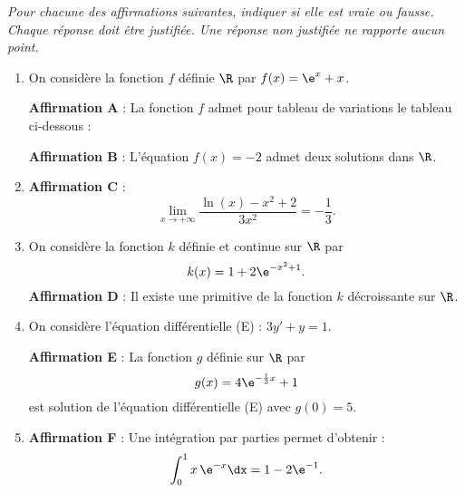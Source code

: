 \textit{Pour chacune des affirmations suivantes, indiquer si elle est vraie ou fausse.\\Chaque réponse doit être justifiée. Une réponse non justifiée ne rapporte aucun point.}

\smallskip

\begin{enumerate}
	\item On considère la fonction $f$ définie $\R$ par $f(x)=\e^x+x$.
	
	\textbf{Affirmation A} : La fonction $f$ admet pour tableau de variations le tableau ci-dessous :
	
	\begin{Centrage}
	\end{Centrage}
	
	\textbf{Affirmation B} : L’équation $f(x)=-2$ admet deux solutions dans $\R$.
	\item \textbf{Affirmation C} : \[ \lim\limits_{x\to+\infty} \frac{\ln(x)-x^2+2}{3x^2}=-\frac13. \]
	\item On considère la fonction $k$ définie et continue sur $\R$ par \[   k(x) = 1 + 2\e^{-x^2+1}.\]
	\textbf{Affirmation D} : Il existe une primitive de la fonction $k$ décroissante sur $\R$.
	\item On considère l’équation différentielle (E) : $3y'+y=1$.
	
	\textbf{Affirmation E} : La fonction $g$ définie sur $\R$ par \[ g(x)=4\e^{-\frac13x}+1 \]
	est solution de l’équation différentielle (E) avec $g(0) = 5$.
	\item \textbf{Affirmation F} : Une intégration par parties permet d’obtenir : \[ \int_0^1 x\,\e^{-x} \dx = 1-2\e^{-1}.\]
\end{enumerate}